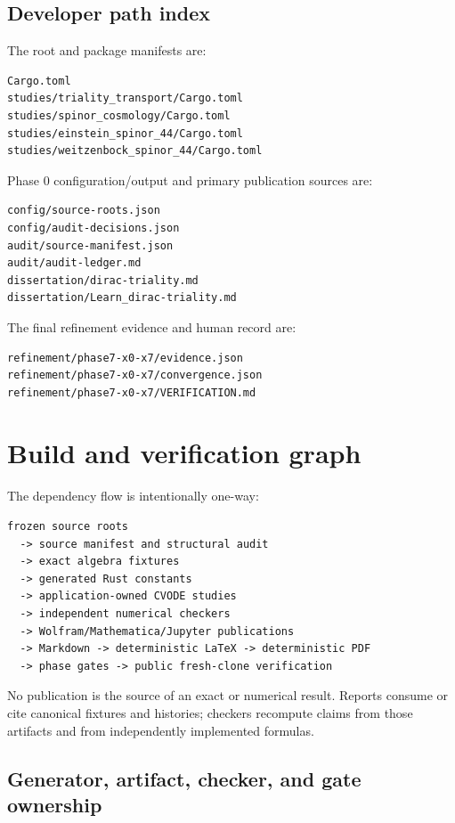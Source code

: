 \documentclass[11pt]{article}
\begin{document}
\subsection{Developer path index}

The root and package manifests are:

\begin{Verbatim}[fontsize=\small]
Cargo.toml
studies/triality_transport/Cargo.toml
studies/spinor_cosmology/Cargo.toml
studies/einstein_spinor_44/Cargo.toml
studies/weitzenbock_spinor_44/Cargo.toml
\end{Verbatim}

Phase 0 configuration/output and primary publication sources are:

\begin{Verbatim}[fontsize=\small]
config/source-roots.json
config/audit-decisions.json
audit/source-manifest.json
audit/audit-ledger.md
dissertation/dirac-triality.md
dissertation/Learn_dirac-triality.md
\end{Verbatim}

The final refinement evidence and human record are:

\begin{Verbatim}[fontsize=\small]
refinement/phase7-x0-x7/evidence.json
refinement/phase7-x0-x7/convergence.json
refinement/phase7-x0-x7/VERIFICATION.md
\end{Verbatim}

\section{Build and verification graph}

The dependency flow is intentionally one-way:

\begin{Verbatim}[fontsize=\small]
frozen source roots
  -> source manifest and structural audit
  -> exact algebra fixtures
  -> generated Rust constants
  -> application-owned CVODE studies
  -> independent numerical checkers
  -> Wolfram/Mathematica/Jupyter publications
  -> Markdown -> deterministic LaTeX -> deterministic PDF
  -> phase gates -> public fresh-clone verification
\end{Verbatim}

No publication is the source of an exact or numerical result. Reports consume or cite canonical fixtures and histories; checkers recompute claims from those artifacts and from independently implemented formulas.

\subsection{Generator, artifact, checker, and gate ownership}
\end{document}
